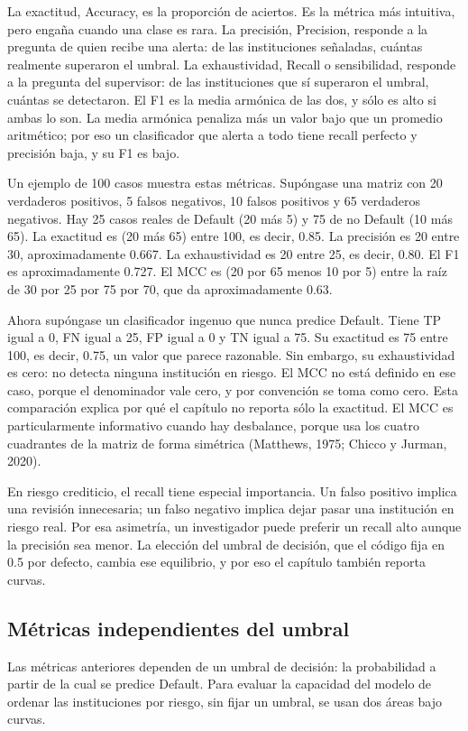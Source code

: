 La exactitud, Accuracy, es la proporción de aciertos. Es la métrica más intuitiva, pero engaña cuando una clase es rara. La precisión, Precision, responde a la pregunta de quien recibe una alerta: de las instituciones señaladas, cuántas realmente superaron el umbral. La exhaustividad, Recall o sensibilidad, responde a la pregunta del supervisor: de las instituciones que sí superaron el umbral, cuántas se detectaron. El F1 es la media armónica de las dos, y sólo es alto si ambas lo son. La media armónica penaliza más un valor bajo que un promedio aritmético; por eso un clasificador que alerta a todo tiene recall perfecto y precisión baja, y su F1 es bajo.

Un ejemplo de 100 casos muestra estas métricas. Supóngase una matriz con 20 verdaderos positivos, 5 falsos negativos, 10 falsos positivos y 65 verdaderos negativos. Hay 25 casos reales de Default (20 más 5) y 75 de no Default (10 más 65). La exactitud es (20 más 65) entre 100, es decir, 0.85. La precisión es 20 entre 30, aproximadamente 0.667. La exhaustividad es 20 entre 25, es decir, 0.80. El F1 es aproximadamente 0.727. El MCC es (20 por 65 menos 10 por 5) entre la raíz de 30 por 25 por 75 por 70, que da aproximadamente 0.63.

Ahora supóngase un clasificador ingenuo que nunca predice Default. Tiene TP igual a 0, FN igual a 25, FP igual a 0 y TN igual a 75. Su exactitud es 75 entre 100, es decir, 0.75, un valor que parece razonable. Sin embargo, su exhaustividad es cero: no detecta ninguna institución en riesgo. El MCC no está definido en ese caso, porque el denominador vale cero, y por convención se toma como cero. Esta comparación explica por qué el capítulo no reporta sólo la exactitud. El MCC es particularmente informativo cuando hay desbalance, porque usa los cuatro cuadrantes de la matriz de forma simétrica (Matthews, 1975; Chicco y Jurman, 2020).

En riesgo crediticio, el recall tiene especial importancia. Un falso positivo implica una revisión innecesaria; un falso negativo implica dejar pasar una institución en riesgo real. Por esa asimetría, un investigador puede preferir un recall alto aunque la precisión sea menor. La elección del umbral de decisión, que el código fija en 0.5 por defecto, cambia ese equilibrio, y por eso el capítulo también reporta curvas.

\subsection{Métricas independientes del umbral}
Las métricas anteriores dependen de un umbral de decisión: la probabilidad a partir de la cual se predice Default. Para evaluar la capacidad del modelo de ordenar las instituciones por riesgo, sin fijar un umbral, se usan dos áreas bajo curvas.

